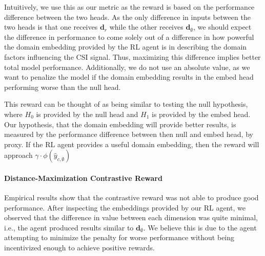 Intuitively, we use this as our metric as the reward is based on the performance difference between the two heads.
As the only difference in inputs between the two heads is that one receives $\boldsymbol{d}_r$ while the other receives $\boldsymbol{d}_\emptyset$, we should expect the difference in performance to come solely out of a difference in how powerful the domain embedding provided by the RL agent is in describing the domain factors influencing the CSI signal.
Thus, maximizing this difference implies better total model performance.
Additionally, we do not use an absolute value, as we want to penalize the model if the domain embedding results in the embed head performing worse than the null head.

This reward can be thought of as being similar to testing the null hypothesis, where $H_0$ is provided by the null head and $H_1$ is provided by the embed head.
Our hypothesis, that the domain embedding will provide better results, is measured by the performance difference between then null and embed head, by proxy.
If the RL agent provides a useful domain embedding, then the reward will approach $\gamma \cdot \phi\left(\hat{y}_{c,\emptyset}\right)$

\paragraph{Distance-Maximization Contrastive Reward}
Empirical results show that the contrastive reward was not able to produce good performance.
After inspecting the embeddings provided by our RL agent, we observed that the difference in value between each dimension was quite minimal, i.e., the agent produced results similar to $\boldsymbol{d}_\emptyset$.
We believe this is due to the agent attempting to minimize the penalty for worse performance without being incentivized enough to achieve positive rewards.

